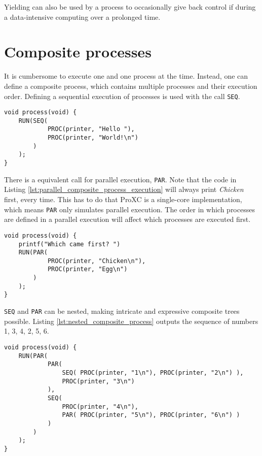 Yielding can also be used by a process to occasionally give back control if during a data\hyp{}intensive computing over a prolonged time. 

\section*{Composite processes}

It is cumbersome to execute one and one process at the time. Instead, one can define a composite process, which contains multiple processes and their execution order. Defining a sequential execution of processes is used with the call \texttt{SEQ}.  

\begin{lstlisting}[style={CustomC},caption={Sequential composite process execution}]
void process(void) {
    RUN(SEQ(
            PROC(printer, "Hello "),
            PROC(printer, "World!\n")
        )
    );
}
\end{lstlisting}

There is a equivalent call for parallel execution, \texttt{PAR}. Note that the code in Listing \ref{lst:parallel_composite_process_execution} will always print \textit{Chicken} first, every time. This has to do that ProXC is a single\hyp{}core implementation, which means \texttt{PAR} only simulates parallel execution. The order in which processes are defined in a parallel execution will affect which processes are executed first. 

\begin{lstlisting}[style={CustomC},caption={Parallel composite process execution},label={lst:parallel_composite_process_execution}]
void process(void) {
    printf("Which came first? ")
    RUN(PAR(
            PROC(printer, "Chicken\n"),
            PROC(printer, "Egg\n")
        )
    );  
}
\end{lstlisting}

\texttt{SEQ} and \texttt{PAR} can be nested, making intricate and expressive composite trees possible. Listing \ref{lst:nested_composite_process} outputs the sequence of numbers 1, 3, 4, 2, 5, 6.  

\begin{lstlisting}[style={CustomC},caption={Nested composite process},label={lst:nested_composite_process}]
void process(void) {
    RUN(PAR(
            PAR(
                SEQ( PROC(printer, "1\n"), PROC(printer, "2\n") ),
                PROC(printer, "3\n")
            ),
            SEQ(
                PROC(printer, "4\n"),
                PAR( PROC(printer, "5\n"), PROC(printer, "6\n") )
            )
        )
    );  
}
\end{lstlisting}

